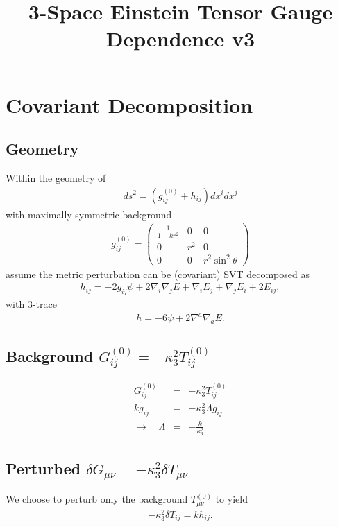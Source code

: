 \documentclass[10pt,letterpaper]{article}
\title{3-Space Einstein Tensor Gauge Dependence v3}
\date{}
\numberwithin{equation}{section}
\begin{document}
 
\maketitle
\noindent 
\section{Covariant Decomposition}

\subsection{Geometry} 
\label{S1}
Within the geometry of 
\begin{eqnarray}
ds^2 = (g_{ij}^{(0)} + h_{ij})dx^i dx^j 
\end{eqnarray}
with maximally symmetric background
\begin{eqnarray}
g_{ij}^{(0)} = \begin{pmatrix} \frac{1}{1-kr^2} &0&0\\ 0&r^2&0\\0&0&r^2\sin^2\theta\end{pmatrix}
\end{eqnarray}
assume the metric perturbation can be (covariant) SVT decomposed as
\begin{eqnarray}
h_{ij} = -2 g_{ij}\psi + 2\nabla_i\nabla_j E + \nabla_i E_j + \nabla_j E_i + 2E_{ij},
\label{svt}
\end{eqnarray}
with 3-trace
\begin{eqnarray}
h = -6 \psi + 2\nabla^a\nabla_a E.
\end{eqnarray}

\subsection{Background $G^{(0)}_{ij} = - \kappa^2_3 T^{(0)}_{ij}$}
\begin{eqnarray}
G^{(0)}_{ij} &=& - \kappa^2_3 T^{(0)}_{ij}
\nonumber\\
k g_{ij} &=& - \kappa^2_3 \Lambda g_{ij}
\nonumber\\
\to\quad  \Lambda &=& -\frac{k}{\kappa^2_3}
\label{lambdakappa}
\end{eqnarray}

\subsection{Perturbed $\delta G_{\mu\nu} =-\kappa^2_3 \delta T_{\mu\nu}$}
We choose to perturb only the background $T_{\mu\nu}^{(0)}$ to yield
\begin{eqnarray}
-\kappa_3^2 \delta T_{ij} = k h_{ij}.
\end{eqnarray}
\end{document}
